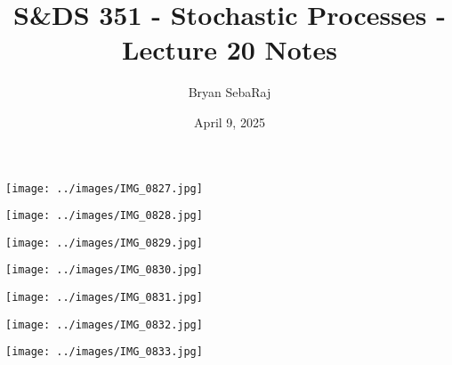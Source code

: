 \documentclass{article}
\title{S\&DS 351 - Stochastic Processes - Lecture 20 Notes}
\author{Bryan SebaRaj}
\date{April 9, 2025}
\begin{document}
\maketitle

\texttt{[image: ../images/IMG\_0827.jpg]}

\texttt{[image: ../images/IMG\_0828.jpg]}

\texttt{[image: ../images/IMG\_0829.jpg]}

\texttt{[image: ../images/IMG\_0830.jpg]}

\texttt{[image: ../images/IMG\_0831.jpg]}

\texttt{[image: ../images/IMG\_0832.jpg]}

\texttt{[image: ../images/IMG\_0833.jpg]}
\end{document}
